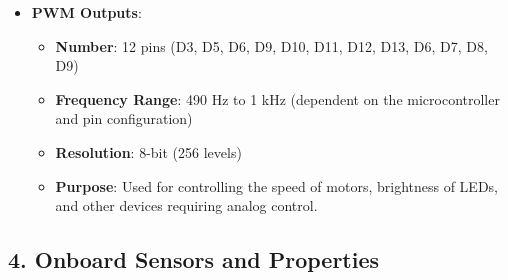 \begin{itemize}
		\item \textbf{PWM Outputs}:
		\begin{itemize}
			\item \textbf{Number}: 12 pins (D3, D5, D6, D9, D10, D11, D12, D13, D6, D7, D8, D9)
			\item \textbf{Frequency Range}: 490 Hz to 1 kHz (dependent on the microcontroller and pin configuration)
			\item \textbf{Resolution}: 8-bit (256 levels)
			\item \textbf{Purpose}: Used for controlling the speed of motors, brightness of LEDs, and other devices requiring analog control.
		\end{itemize}
	\end{itemize}
	
	\subsection*{4. Onboard Sensors and Properties}
	
